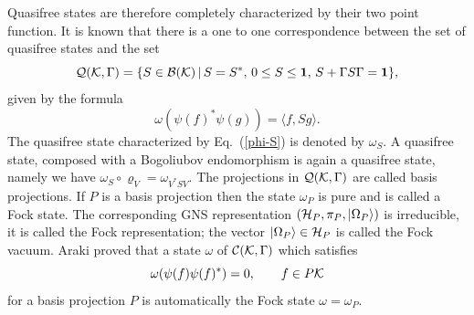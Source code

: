 \documentclass[10pt,a4paper]{article}
\begin{document}
Quasifree states are therefore completely characterized by
their two point function. It is known that there is a
one to one correspondence between the set of quasifree
states and the set
\[ {\cal Q}({\cal K},\Gamma)=\{S\in{\cal B}({\cal K})
\,|\, S=S^*,\, 0 \le S \le {\bf 1},\,
S + \Gamma S \Gamma = {\bf 1} \}, \]
given by the formula
\begin{equation}
\label{phi-S}
\omega (\psi(f)^* \psi(g)) = \langle f,Sg \rangle .
\end{equation}
The quasifree state characterized by Eq.~(\ref{phi-S})
is denoted
by $\omega_S$. A quasifree state, composed with a
Bogoliubov endomorphism is again a quasifree state,
namely we have $\omega_S\circ\varrho_V=
\omega_{V^*SV}$. The projections in ${\cal Q}({\cal K},\Gamma)$
are called basis projections. If $P$ is a basis projection
then the state $\omega_P$ is pure and is called a
Fock state. The corresponding GNS representation
$({\cal H}_P,\pi_P,|\Omega_P\rangle)$
is irreducible, it is called the Fock representation;
the vector $|\Omega_P\rangle\in{\cal H}_P$ is
called the Fock vacuum. Araki proved
\cite{Ara1,Ara2} that a state $\omega$
of ${\cal C}({\cal K},\Gamma)$ which satisfies
\begin{equation}
\omega(\psi(f)\psi(f)^*)=0, \qquad f\in P{\cal K}
\end{equation}
for a basis projection $P$ is automatically
the Fock state $\omega=\omega_P$.
\end{document}
